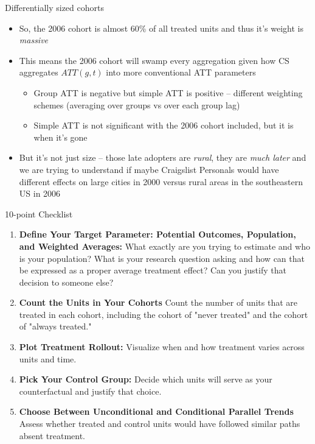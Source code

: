 \documentclass{beamer}
\begin{document}
\begin{frame}{Differentially sized cohorts}

\begin{itemize}
\item So, the 2006 cohort is almost 60\% of all treated units and thus it's weight is \emph{massive} 
\item This means the 2006 cohort will swamp every aggregation given how CS aggregates $ATT(g,t)$ into more conventional ATT parameters
    \begin{itemize}
    \item Group ATT is negative but simple ATT is positive -- different weighting schemes (averaging over groups vs over each group lag)
    \item Simple ATT is not significant with the 2006 cohort included, but it is when it's gone
    \end{itemize}
\item But it's not just size -- those late adopters are \emph{rural}, they are \emph{much later} and we are trying to understand if maybe Craigslist Personals would have different effects on large cities in 2000 versus rural areas in the southeastern US in 2006
\end{itemize}
\end{frame}

\begin{frame}{10-point Checklist}

\begin{enumerate}
\item \textbf{Define Your Target Parameter: Potential Outcomes, Population, and Weighted Averages:} What exactly are you trying to estimate and who is your population? What is your research question asking and how can that be expressed as a proper average treatment effect?  Can you justify that decision to someone else?
\item \textbf{Count the Units in Your Cohorts} Count the number of units that are treated in each cohort, including the cohort of "never treated" and the cohort of "always treated."
\item \textbf{Plot Treatment Rollout:} Visualize when and how treatment varies across units and time.
\item \textbf{Pick Your Control Group:} Decide which units will serve as your counterfactual and justify that choice.
\item \textbf{Choose Between Unconditional and Conditional Parallel Trends} Assess whether treated and control units would have followed similar paths absent treatment.
\end{enumerate}


\end{frame}
\end{document}
